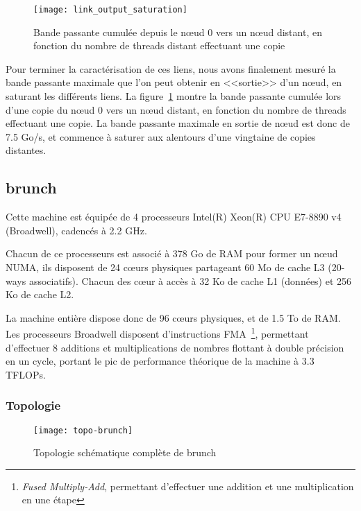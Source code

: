\begin{figure}[ht]
  \centering
  \texttt{[image: link\_output\_saturation]}
  \caption{Bande passante cumulée depuis le nœud 0 vers un nœud distant, en fonction du nombre de threads distant effectuant une copie}\label{fig:contribs:machines:idchire:saturation-output}
\end{figure}

Pour terminer la caractérisation de ces liens, nous avons finalement mesuré la bande passante maximale que l'on peut obtenir en <<sortie>> d'un nœud, en saturant les différents liens.
La figure~\ref{fig:contribs:machines:idchire:saturation-output} montre la bande passante cumulée lors d'une copie du nœud 0 vers un nœud distant, en fonction du nombre de threads effectuant une copie.
La bande passante maximale en sortie de nœud est donc de 7.5 Go/s, et commence à saturer aux alentours d'une vingtaine de copies distantes.



\subsection{brunch}\label{sec:contribs:machines:brunch}

Cette machine est équipée de 4 processeurs Intel(R) Xeon(R) CPU E7-8890 v4 (Broadwell), cadencés à 2.2 GHz.

Chacun de ce processeurs est associé à 378 Go de RAM pour former un nœud NUMA, ils disposent de 24 cœurs physiques partageant 60 Mo de cache L3 (20-ways associatifs).
Chacun des cœur à accès à 32 Ko de cache L1 (données) et 256 Ko de cache L2.

La machine entière dispose donc de 96 cœurs physiques, et de 1.5 To de RAM.
Les processeurs Broadwell disposent d'instructions FMA~\footnote{\emph{Fused Multiply-Add}, permettant d'effectuer une addition et une multiplication en une étape}, permettant d'effectuer 8 additions et multiplications de nombres flottant à double précision en un cycle, portant le pic de performance théorique de la machine à 3.3 TFLOPs.


\subsubsection{Topologie}

\begin{figure}[ht]
  \centering
  \texttt{[image: topo-brunch]}
  \caption{Topologie schématique complète de brunch}\label{fig:contribs:machines:brunch:topo-liens}
\end{figure}

